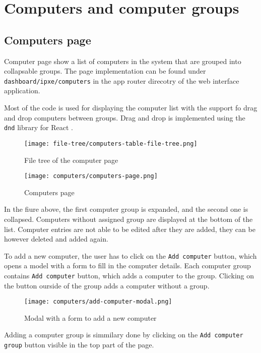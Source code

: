 \documentclass[../main.tex]{subfiles}
\begin{document}
\section{Computers and computer groups}

\subsection{Computers page}

Computer page show a list of computers in the system that are grouped into collapsable groups.
The page implementation can be found under \texttt{dashboard/ipxe/computers} in the
app router direcotry of the web interface application.

Most of the code is used for displaying the computer list with the support fo drag and drop computers between groups.
Drag and drop is implemented using the \texttt{dnd} library for React \cite{dnd}.

\begin{figure}[H]
  \centering
  \texttt{[image: file-tree/computers-table-file-tree.png]}
  \caption{File tree of the computer page}
\end{figure}

\begin{figure}[H]
  \centering
  \texttt{[image: computers/computers-page.png]}
  \caption{Computers page}
\end{figure}

In the fiure above, the first computer group is expanded, and the second one is collapsed. Computers without assigned group are displayed at the bottom of the list.
Computer entries are not able to be edited after they are added, they can be however deleted and added again.

To add a new computer, the user has to click on the \texttt{Add computer} button, which opens a model with a form to fill in the computer details.
Each computer group contains \texttt{Add computer} button, which adds a computer to the group. Clicking on the button ourside of the group adds a computer without a group.

\begin{figure}[H]
  \centering
  \texttt{[image: computers/add-computer-modal.png]}
  \caption{Modal with a form to add a new computer}
\end{figure}

Adding a computer group is simmilary done by clicking on the \texttt{Add computer group} button visible in the top part of the page.
\end{document}
